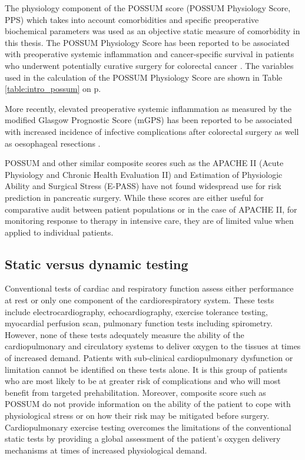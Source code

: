 The physiology component of the POSSUM score (POSSUM Physiology Score, PPS) which takes into account comorbidities and specific preoperative biochemical parameters was used as an objective static measure of comorbidity in this thesis. 
The POSSUM Physiology Score has been reported to be associated with preoperative systemic inflammation and cancer-specific survival in patients who underwent potentially curative surgery for colorectal cancer \parencite{richards_relationship_2010}.
The variables used in the calculation of the POSSUM Physiology Score are shown in Table \ref{table:intro_possum} on p\pageref{table:intro_possum}.



More recently, elevated preoperative systemic inflammation as measured by the modified Glasgow Prognostic Score (mGPS) has been reported to be associated with increased incidence of infective complications after colorectal surgery \parencite{moyes_preoperative_2009} as well as oesophageal resections \parencite{vashist_glasgow_2010}.

POSSUM and other similar composite scores such as the APACHE II (Acute Physiology and Chronic Health Evaluation II) \parencite{knaus_apache_1985} and Estimation of Physiologic Ability and Surgical Stress (E-PASS)  \parencite{haga_estimation_1999, hashimoto_is_2010} have not found widespread use for risk prediction in pancreatic surgery.
While these scores are either useful for comparative audit between patient populations or in the case of APACHE II, for monitoring response to therapy in intensive care, they are of limited value when applied to individual patients.

\subsection{Static versus dynamic testing}

Conventional tests of cardiac and respiratory function assess either performance at rest or only one component of the cardiorespiratory system. 
These tests include electrocardiography, echocardiography, exercise tolerance testing, myocardial perfusion scan, pulmonary function tests including spirometry. 
However, none of these tests adequately measure the ability of the cardiopulmonary and circulatory systems to deliver oxygen to the tissues at times of increased demand. 
Patients with sub-clinical cardiopulmonary dysfunction or limitation cannot be identified on these tests alone. 
It is this group of patients who are most likely to be at greater risk of complications and who will most benefit from targeted prehabilitation. 
Moreover, composite score such as POSSUM do not provide information on the ability of the patient to cope with physiological stress or on how their risk may be mitigated before surgery.
Cardiopulmonary exercise testing overcomes the limitations of the conventional static tests by providing a global assessment of the patient's oxygen delivery mechanisms at times of increased physiological demand.

